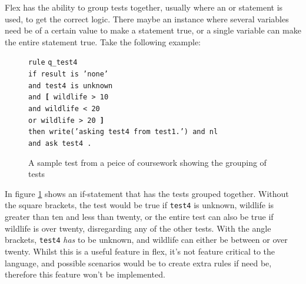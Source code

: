 \documentclass[12pt]{report}
\begin{document}
Flex has the ability to group tests together, usually where an or statement is used, to get the correct logic.  There maybe an instance where several variables need be of a certain value to make a statement true, or a single variable can make the entire statement true.  Take the following example:
\begin{figure}[H]
	\begin{tabbing}
		\texttt{rule} \= \texttt{q\_test4}\\
		\> \texttt{if result is 'none'}\\
		\> \texttt{and test4 is unknown}\\
		\> \texttt{and \textbf{[} wildlife > 10}\\
		\> \texttt{and wildlife < 20}\\
		\> \texttt{or wildlife > 20 \textbf{]}}\\
		\> \texttt{then write('asking test4 from test1.') and nl}\\
		\> \texttt{and ask test4 .}\\
	\end{tabbing}
	\caption{A sample test from a peice of coursework showing the grouping of tests}\label{fig:if_grouping}
\end{figure}
In figure \ref{fig:if_grouping} shows an if-statement that has the tests grouped together.  Without the square brackets, the test would be true if \texttt{test4} is unknown, wildlife is greater than ten and less than twenty, or the entire test can also be true if wildlife is over twenty, disregarding any of the other tests.  With the angle brackets, \texttt{test4} \textit{has} to be unknown, and wildlife can either be between or over twenty.  Whilst this is a useful feature in flex, it's not feature critical to the language, and possible scenarios would be to create extra rules if need be, therefore this feature won't be implemented.
\end{document}
